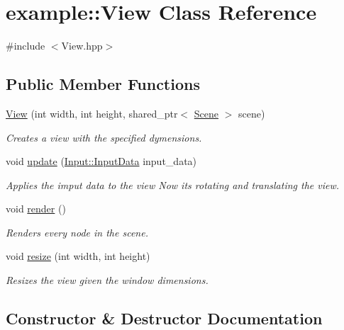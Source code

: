 \hypertarget{classexample_1_1_view}{}\section{example\+:\+:View Class Reference}
\label{classexample_1_1_view}


{\ttfamily \#include $<$View.\+hpp$>$}

\subsection*{Public Member Functions}
\begin{DoxyCompactItemize}
\item 
\mbox{\hyperlink{classexample_1_1_view_ae7f67b78cdd174449edc93960f29d9f4}{View}} (int width, int height, shared\+\_\+ptr$<$ \mbox{\hyperlink{classexample_1_1_scene}{Scene}} $>$ scene)
\begin{DoxyCompactList}\small\item\em Creates a view with the specified dymensions. \end{DoxyCompactList}\item 
void \mbox{\hyperlink{classexample_1_1_view_ac0b18fc4d2abe1abca6940c55313ef3b}{update}} (\mbox{\hyperlink{classexample_1_1_input_a574fd91f61d018474389e778c31e0da2}{Input\+::\+Input\+Data}} input\+\_\+data)
\begin{DoxyCompactList}\small\item\em Applies the imput data to the view Now it\textquotesingle{}s rotating and translating the view. \end{DoxyCompactList}\item 
void \mbox{\hyperlink{classexample_1_1_view_a10ea89fc705a2ba2252f673499524bf2}{render}} ()
\begin{DoxyCompactList}\small\item\em Renders every node in the scene. \end{DoxyCompactList}\item 
void \mbox{\hyperlink{classexample_1_1_view_a2396337a1db393acefb174e386cde7d1}{resize}} (int width, int height)
\begin{DoxyCompactList}\small\item\em Resizes the view given the window dimensions. \end{DoxyCompactList}\end{DoxyCompactItemize}


\subsection{Constructor \& Destructor Documentation}
\mbox{\label{classexample_1_1_view_ae7f67b78cdd174449edc93960f29d9f4}} 
